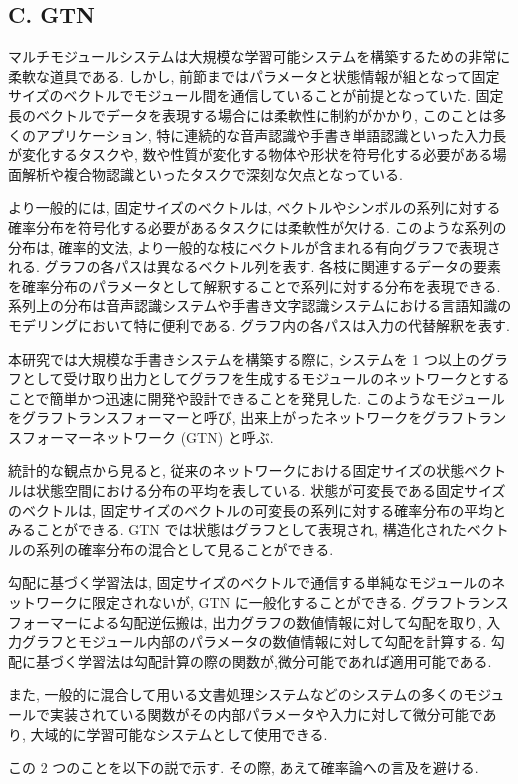 \documentclass[twocolumn]{jarticle}     %
\begin{document}
\subsection{C. GTN}
マルチモジュールシステムは大規模な学習可能システムを構築するための非常に柔軟な道具である. しかし, 前節まではパラメータと状態情報が組となって固定サイズのベクトルでモジュール間を通信していることが前提となっていた.
固定長のベクトルでデータを表現する場合には柔軟性に制約がかかり, このことは多くのアプリケーション, 特に連続的な音声認識や手書き単語認識といった入力長が変化するタスクや, 数や性質が変化する物体や形状を符号化する必要がある場面解析や複合物認識といったタスクで深刻な欠点となっている.
\par
より一般的には, 固定サイズのベクトルは, ベクトルやシンボルの系列に対する確率分布を符号化する必要があるタスクには柔軟性が欠ける. このような系列の分布は, 確率的文法, より一般的な枝にベクトルが含まれる有向グラフで表現される. 
グラフの各パスは異なるベクトル列を表す. 各枝に関連するデータの要素を確率分布のパラメータとして解釈することで系列に対する分布を表現できる. 系列上の分布は音声認識システムや手書き文字認識システムにおける言語知識のモデリングにおいて特に便利である. グラフ内の各パスは入力の代替解釈を表す.
\par
本研究では大規模な手書きシステムを構築する際に, システムを 1 つ以上のグラフとして受け取り出力としてグラフを生成するモジュールのネットワークとすることで簡単かつ迅速に開発や設計できることを発見した.
このようなモジュールをグラフトランスフォーマーと呼び, 出来上がったネットワークをグラフトランスフォーマーネットワーク (GTN) と呼ぶ.
\par
統計的な観点から見ると, 従来のネットワークにおける固定サイズの状態ベクトルは状態空間における分布の平均を表している.
状態が可変長である固定サイズのベクトルは, 固定サイズのベクトルの可変長の系列に対する確率分布の平均とみることができる.
GTN では状態はグラフとして表現され, 構造化されたベクトルの系列の確率分布の混合として見ることができる.
\par
勾配に基づく学習法は, 固定サイズのベクトルで通信する単純なモジュールのネットワークに限定されないが, GTN に一般化することができる.
グラフトランスフォーマーによる勾配逆伝搬は, 出力グラフの数値情報に対して勾配を取り, 入力グラフとモジュール内部のパラメータの数値情報に対して勾配を計算する. 勾配に基づく学習法は勾配計算の際の関数が,微分可能であれば適用可能である.
\par
また, 一般的に混合して用いる文書処理システムなどのシステムの多くのモジュールで実装されている関数がその内部パラメータや入力に対して微分可能であり, 大域的に学習可能なシステムとして使用できる.
\par
この 2 つのことを以下の説で示す. その際, あえて確率論への言及を避ける. 
\end{document}
